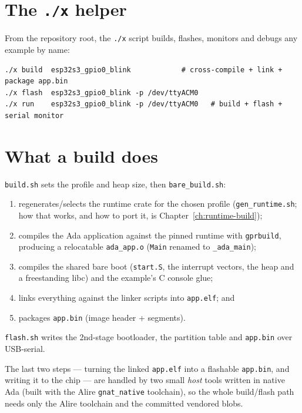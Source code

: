 \section{The \texttt{./x} helper}

From the repository root, the \texttt{./x} script builds, flashes, monitors and
debugs any example by name:

\begin{lstlisting}[style=sh]
./x build  esp32s3_gpio0_blink            # cross-compile + link + package app.bin
./x flash  esp32s3_gpio0_blink -p /dev/ttyACM0
./x run    esp32s3_gpio0_blink -p /dev/ttyACM0   # build + flash + serial monitor
\end{lstlisting}

\section{What a build does}

\texttt{build.sh} sets the profile and heap size, then \texttt{bare\_build.sh}:

\begin{enumerate}
\item regenerates/selects the runtime crate for the chosen profile
  (\texttt{gen\_runtime.sh}; how that works, and how to port it, is
  Chapter~\ref{ch:runtime-build});
\item compiles the Ada application against the pinned runtime with
  \texttt{gprbuild}, producing a relocatable \texttt{ada\_app.o}
  (\texttt{Main} renamed to \texttt{\_ada\_main});
\item compiles the shared bare boot (\texttt{start.S}, the interrupt vectors,
  the heap and a freestanding libc) and the example's C console glue;
\item links everything against the linker scripts into \texttt{app.elf}; and
\item packages \texttt{app.bin} (image header + segments).
\end{enumerate}

\texttt{flash.sh} writes the 2nd-stage bootloader, the partition table and
\texttt{app.bin} over USB-serial.

The last two steps --- turning the linked \texttt{app.elf} into a flashable
\texttt{app.bin}, and writing it to the chip --- are handled by two small
\emph{host} tools written in native Ada (built with the Alire
\texttt{gnat\_native} toolchain), so the whole build/flash path needs only the
Alire toolchain and the committed vendored blobs.

